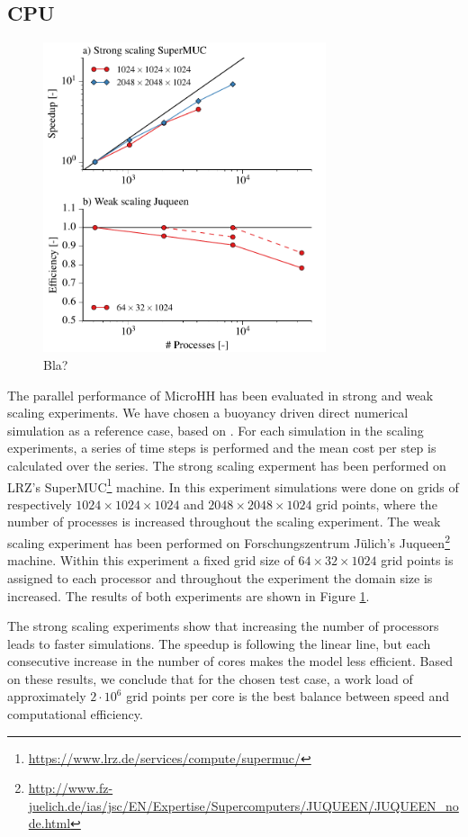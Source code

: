 \documentclass[gmd]{copernicus}
\begin{document}
\subsection{CPU}
\begin{figure}[!hbt]
	\vspace*{2mm}
	\begin{center}
		\includegraphics[width=8.3cm]{figs/scaling.pdf}
	\end{center}
	\caption{Bla?}\label{fig:scaling}
\end{figure}
The parallel performance of MicroHH has been evaluated in strong and weak scaling experiments. We have chosen a buoyancy driven direct numerical simulation as a reference case, based on \citet{vanHeerwaarden2014}. For each simulation in the scaling experiments, a series of time steps is performed and the mean cost per step is calculated over the series. The strong scaling experment has been performed on LRZ's SuperMUC\footnote{\url{https://www.lrz.de/services/compute/supermuc/}} machine. In this experiment simulations were done on grids of respectively $1024 \times 1024 \times 1024$ and $2048 \times 2048 \times 1024$ grid points, where the number of processes is increased throughout the scaling experiment. The weak scaling experiment has been performed on Forschungszentrum J\"{u}lich's Juqueen\footnote{\url{http://www.fz-juelich.de/ias/jsc/EN/Expertise/Supercomputers/JUQUEEN/JUQUEEN_node.html}} machine. Within this experiment a fixed grid size of $64 \times 32 \times 1024$ grid points is assigned to each processor and throughout the experiment the domain size is increased. The results of both experiments are shown in Figure \ref{fig:scaling}.

The strong scaling experiments show that increasing the number of processors leads to faster simulations. The speedup is following the linear line, but each consecutive increase in the number of cores makes the model less efficient. Based on these results, we conclude that for the chosen test case, a work load of approximately $2\cdot 10^6$ grid points per core is the best balance between speed and computational efficiency.
\end{document}
